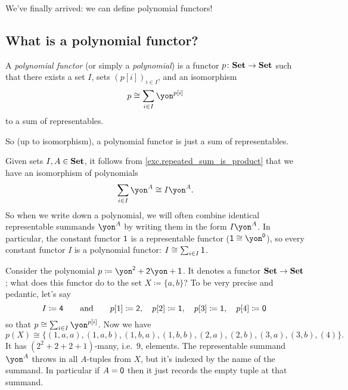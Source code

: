 \documentclass[Book-Poly]{subfiles}
\begin{document}
We've finally arrived: we can define polynomial functors!

\subsection{What is a polynomial functor?} \label{subsec.poly.func_nat.repr_sum.what}

\begin{definition}
A \emph{polynomial functor} (or simply a \emph{polynomial}) is a functor $p\colon\mathbf{Set}\to\mathbf{Set}$ such that there exists a set $I$, sets $(p[i])_{i\in I}$, and an isomorphism
\[p\cong\sum_{i\in I}\yon^{p[i]}\]
to a sum of representables.
\end{definition}

So (up to isomorphism), a polynomial functor is just a sum of representables.

\begin{remark}
Given sets $I, A \in \mathbf{Set}$, it follows from \cref{exc.repeated_sum_is_product} that we have an isomorphism of polynomials
\[
    \sum_{i \in I} \yon^A \iso I\yon^A.
\]
So when we write down a polynomial, we will often combine identical representable summands $\yon^A$ by writing them in the form $I\yon^A$.
In particular, the constant functor $\textsf{1}$ is a representable functor ($\1 \iso \yon^\0$), so every constant functor $I$ is a polynomial functor: $I \cong \sum_{i \in I} \textsf{1}$.
\end{remark}

\begin{example}\label{ex.pedantic_poly_eval}
Consider the polynomial $p \coloneqq \yon^\2+\2\yon+\1$. It denotes a functor $\mathbf{Set}\to\mathbf{Set}$; what does this functor do to the set $X\coloneqq\{a,b\}$? 
To be very precise and pedantic, let's say
\[
I\coloneqq\textsf{4}\qquad\text{and}\qquad
  p[1]\coloneqq\textsf{2},\quad
  p[2]\coloneqq\textsf{1},\quad
  p[3]\coloneqq\textsf{1},\quad
  p[4]\coloneqq\textsf{0}\
\]
so that $p\cong\sum_{i\in I}\yon^{p[i]}$. Now we have
\[
p(X)\cong
\{(1,a,a),(1,a,b),(1,b,a),(1,b,b),(2,a),(2,b),(3,a),(3,b),(4)\}.
\]
It has $(2^2+2+2+1)$-many, i.e.\ $9$, elements. The representable summand $\yon^A$ throws in all $A$-tuples from $X$, but it's indexed by the name of the summand. In particular if $A=\textsf{0}$ then it just records the empty tuple at that summand.
\end{example}
\end{document}
